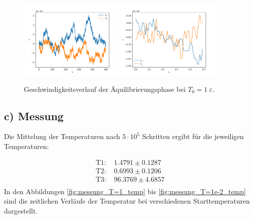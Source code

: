 \begin{figure}
    \centering
    \includegraphics[width=0.45\textwidth]{A1/build/aequi1_V.pdf}
    \includegraphics[width=0.45\textwidth]{A1/build/aequi1_VV.pdf}
    \caption{Geschwindigkeitsverlauf der Äquilibrierungsphase bei $T_\text{0} = 1\:\varepsilon$.}
    \label{fig:v1}
\end{figure}

\FloatBarrier


\subsection*{c) Messung}
Die Mittelung der Temperaturen nach $5\cdot 10^5$ Schritten ergibt für die jeweiligen Temperaturen:

\begin{align}
    \text{ T1:  } &  1.4791  \pm  0.1287 \\
    \text{ T2:  } &  0.6993  \pm  0.1206 \\
    \text{ T3:  } & 96.3769  \pm  4.6857 \\
\end{align}
In den Abbildungen \ref{fig:messung_T=1_temp} bis \ref{fig:messung_T=1e-2_temp}
sind die zeitlichen Verläufe der Temperatur
bei verschiedenen Starttemperaturen dargestellt.

